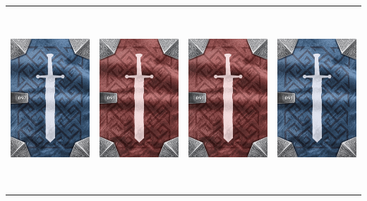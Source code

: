 \documentclass{minimal}
\begin{document}
{\begin{longtable}{llll}
\includegraphics[width=44mm,height=68mm]{./64-151/gh-092a-dampening-ring-back.png} &
\includegraphics[width=44mm,height=68mm]{./64-151/gh-091b-steel-ring-back.png} &
\includegraphics[width=44mm,height=68mm]{./64-151/gh-091b-steel-ring-back.png} &
\includegraphics[width=44mm,height=68mm]{./64-151/gh-091a-steel-ring-back.png}\\ 

\end{longtable}}
\end{document}
